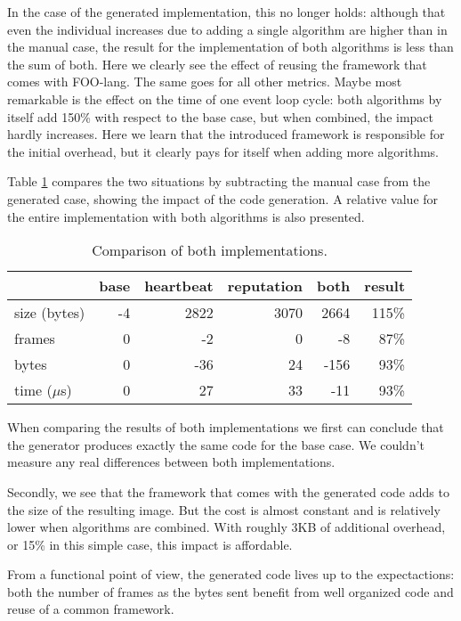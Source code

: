 \documentclass[conference]{IEEEtran}
\begin{document}
In the case of the generated implementation, this no longer holds: although
that even the individual increases due to adding a single algorithm are higher
than in the manual case, the result for the implementation of both algorithms
is less than the sum of both. Here we clearly see the effect of reusing the
framework that comes with FOO-lang. The same goes for all other metrics. Maybe
most remarkable is the effect on the time of one event loop cycle: both
algorithms by itself add 150\% with respect to the base case, but when
combined, the impact hardly increases. Here we learn that the introduced
framework is responsible for the initial overhead, but it clearly pays for
itself when adding more algorithms.

Table \ref{tbl:summary} compares the two situations by subtracting the manual
case from the generated case, showing the impact of the code generation. A
relative value for the entire implementation with both algorithms is also
presented.

\begin{table}[H]
  \centering
  \begin{tabular}{lrrrrr}
  \hline
                & base & heartbeat & reputation & both  & result \\
  \hline
  size (bytes)  & -4    & 2822     & 3070       & 2664  & 115\%  \\
  frames        & 0     & -2       & 0          & -8    & 87\%   \\
  bytes         & 0     & -36      & 24         & -156  & 93\%   \\
  time ($\mu$s) & 0     & 27       & 33         & -11   & 93\%   \\
  \hline
  \end{tabular}
  \caption{Comparison of both implementations.}
  \label{tbl:summary}
\end{table}

When comparing the results of both implementations we first can conclude that
the generator produces exactly the same code for the base case. We couldn't
measure any real differences between both implementations.

Secondly, we see that the framework that comes with the generated code adds to
the size of the resulting image. But the cost is almost constant and is
relatively lower when algorithms are combined. With roughly 3KB of additional
overhead, or 15\% in this simple case, this impact is affordable.

From a functional point of view, the generated code lives up to the
expectactions: both the number of frames as the bytes sent benefit from well
organized code and reuse of a common framework.
\end{document}

